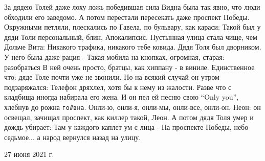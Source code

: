 \begin{multicols}{2}
\obeycr
\noindent 
\smallskip
За дядею Толей даже лоху ложь победившая сила
Видна была так явно, что люди обходили его заведомо.
А потом перестали пересекать даже проспект Победы.
Окружными петляли, плескались по Гавела, по бульвару, как караси:
Такой был у дяди Толи персональный, блин, Апокалипсис.
\smallskip
Пустынная улица стала чище, чем Дольче Вита:
Никакого трафика, никакого тебе ковида.
Дядя Толя был дворником. У него была даже рация -
Такая мобила на кнопках, огромная, старая: разобраться
В ней очень просто, братцы, как хиппану - в виниле.
\smallskip
Единственное что: дяде Толе почти уже не звонили.
Но на всякий случай он утром подзаряжался:
Телефон дряхлел, хотя бы к нему из жалости.
Разве что с кладбища иногда набирала его жена.
\smallskip
И он пел ей песню свою \enquote{Only you}, хлебнув до рожна \verb|го#вна|.
Онли-ю, онли-я, онли-мы, онли-все, онли-он,
Неон: он освещал, зачищал проспект, как киллер такой, Леон.
А потом дядя Толя умер и дождь убирает: Там у каждого каплет ум с лица -
На проспекте Победы, небо седьмое...
а народ вернулся назад на улицу.
\restorecr
\end{multicols}

27 июня 2021 г.
